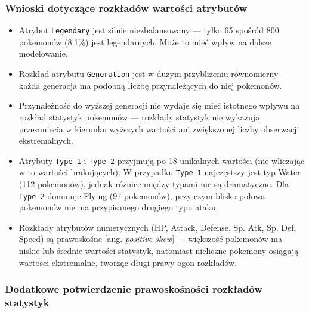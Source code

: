 \documentclass[12pt, a4paper]{report}
\begin{document}
\subsubsection{Wnioski dotyczące rozkładów wartości atrybutów}
\begin{itemize}
    \item Atrybut \texttt{Legendary} jest silnie niezbalansowany — tylko 65 spośród 800 pokemonów (8,1\%) jest legendarnych. Może to mieć wpływ na dalsze modelowanie.
    \item Rozkład atrybutu \texttt{Generation} jest w dużym przybliżeniu równomierny — każda generacja ma podobną liczbę przynależących do niej pokemonów.
    \item Przynależność do wyższej generacji nie wydaje się mieć istotnego wpływu na rozkład statystyk pokemonów — rozkłady statystyk nie wykazują przesunięcia w kierunku wyższych wartości ani zwiększonej liczby obserwacji ekstremalnych.
    \item Atrybuty \texttt{Type 1} i \texttt{Type 2} przyjmują po 18 unikalnych wartości (nie wliczając w to wartości brakujących). W przypadku \texttt{Type 1} najczęstszy jest typ Water (112 pokemonów), jednak różnice między typami nie są dramatyczne. Dla \texttt{Type 2} dominuje Flying (97 pokemonów), przy czym blisko połowa pokemonów nie ma przypisanego drugiego typu ataku.
    \item Rozkłady atrybutów numerycznych (HP, Attack, Defense, Sp. Atk, Sp. Def, Speed) są prawoskośne [ang. \textit{positive skew}] — większość pokemonów ma niskie lub średnie wartości statystyk, natomiast nieliczne pokemony osiągają wartości ekstremalne, tworząc długi prawy ogon rozkładów.
\end{itemize}

\newpage
\subsubsection*{Dodatkowe potwierdzenie prawoskośności rozkładów statystyk}
\end{document}

